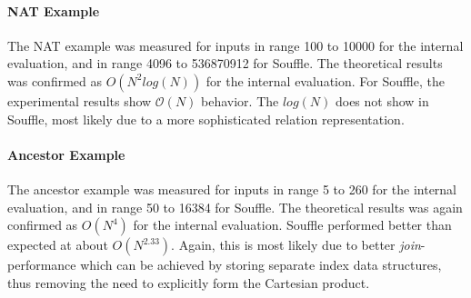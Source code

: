 \paragraph{NAT Example}\NL
The NAT example was measured for inputs in range 100 to 10000 for the internal evaluation, and in range 4096 to 536870912 for Souffle. The theoretical results was confirmed as $O(N^2 log(N))$ for the internal evaluation. For Souffle, the experimental results show $\mathcal{O}(N)$ behavior. The $log(N)$ does not show in Souffle, most likely due to a more sophisticated relation representation\cite{Scholz:2016:FLP:2892208.2892226}.

\paragraph{Ancestor Example}\NL
The ancestor example was measured for inputs in range 5 to 260 for the internal evaluation, and in range 50 to 16384 for Souffle. The theoretical results was again confirmed as $O(N^4)$ for the internal evaluation. Souffle performed better than expected at about $O(N^{2.33})$. Again, this is most likely due to better \textit{join}-performance which can be achieved by storing separate index data structures, thus removing the need to explicitly form the Cartesian product\cite{Scholz:2016:FLP:2892208.2892226}.
\vspace*{-5pt}
